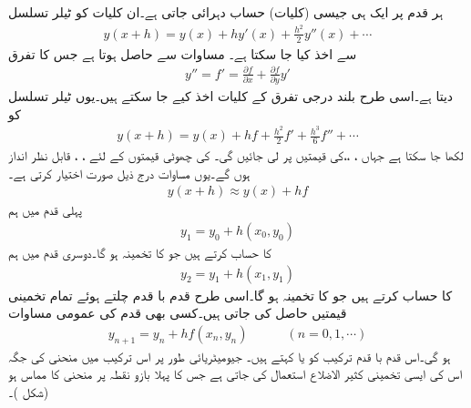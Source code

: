 ہر قدم پر ایک ہی جیسی (کلیات) حساب دہرائی جاتی ہے۔ان کلیات کو ٹیلر تسلسل
\begin{align*}
y(x+h)=y(x)+hy'(x)+\frac{h^2}{2}y''(x)+\cdots
\end{align*}
 سے اخذ کیا جا سکتا ہے۔ مساوات  سے  حاصل ہوتا ہے جس  کا تفرق
\begin{align*}
y''=f'=\tfrac{\partial f}{\partial x}+\tfrac{\partial f}{\partial y}y'
\end{align*}
دیتا ہے۔اسی طرح بلند درجی تفرق کے کلیات اخذ کیے جا سکتے ہیں۔یوں ٹیلر تسلسل کو
\begin{align}\label{مساوات_اعدادی_ابتدائی_مسئلہ_ب}
y(x+h)=y(x)+hf+\frac{h^2}{2}f'+\frac{h^3}{6}f''+\cdots
\end{align}
لکھا جا سکتا ہے جہاں ، ،، کی قیمتیں  پر  لی جائیں گی۔ کی چھوٹی قیمتوں کے لئے ، ،  قابل نظر انداز ہوں گے۔یوں مساوات  درج ذیل صورت اختیار کرتی ہے۔
\begin{align*}
y(x+h)\approx y(x)+hf
\end{align*}
پہلی قدم میں ہم 
\begin{align*}
y_1=y_0+h(x_0,y_0)
\end{align*}
کا حساب کرتے ہیں جو  کا تخمینہ ہو گا۔دوسری قدم میں ہم
 \begin{align*}
y_2=y_1+h(x_1,y_1)
\end{align*}
کا حساب کرتے ہیں جو  کا تخمینہ ہو گا۔اسی طرح قدم با قدم چلتے ہوئے تمام تخمینی قیمتیں حاصل کی جاتی ہیں۔کسی بھی قدم کی عمومی مساوات
\begin{align}\label{مساوات_اعدادی_ابتدائی_مسئلہ_پ}
y_{n+1}=y_n+hf(x_n,y_n)\quad\quad\quad (n=0,1,\cdots)
\end{align}
ہو گی۔اس قدم با قدم ترکیب کو  یا  کہتے ہیں۔ جیومیٹریائی طور پر اس ترکیب میں  منحنی  کی جگہ اس کی ایسی تخمینی کثیر الاضلاع استعمال کی جاتی ہے جس کا پہلا بازو نقطہ  پر منحنی کا مماس ہو (شکل )۔
